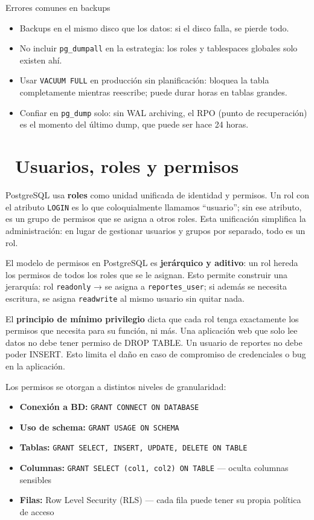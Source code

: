 \begin{warningbox}{Errores comunes en backups}
\begin{itemize}
  \item Backups en el mismo disco que los datos: si el disco falla, se pierde todo.
  \item No incluir \texttt{pg\_dumpall} en la estrategia: los roles y tablespaces globales solo existen ahí.
  \item Usar \texttt{VACUUM FULL} en producción sin planificación: bloquea la tabla completamente mientras reescribe; puede durar horas en tablas grandes.
  \item Confiar en \texttt{pg\_dump} solo: sin WAL archiving, el RPO (punto de recuperación) es el momento del último dump, que puede ser hace 24 horas.
\end{itemize}
\end{warningbox}

\section[Usuarios, roles y permisos]{~Usuarios, roles y permisos}

PostgreSQL usa \textbf{roles} como unidad unificada de identidad y permisos.
Un rol con el atributo \texttt{LOGIN} es lo que coloquialmente llamamos ``usuario''; sin ese atributo, es un grupo de permisos que se asigna a otros roles.
Esta unificación simplifica la administración: en lugar de gestionar usuarios y grupos por separado, todo es un rol.

El modelo de permisos en PostgreSQL es \textbf{jerárquico y aditivo}:
un rol hereda los permisos de todos los roles que se le asignan.
Esto permite construir una jerarquía: rol \texttt{readonly} → se asigna a \texttt{reportes\_user}; si además se necesita escritura, se asigna \texttt{readwrite} al mismo usuario sin quitar nada.

El \textbf{principio de mínimo privilegio} dicta que cada rol tenga exactamente los permisos que necesita para su función, ni más.
Una aplicación web que solo lee datos no debe tener permiso de DROP TABLE.
Un usuario de reportes no debe poder INSERT.
Esto limita el daño en caso de compromiso de credenciales o bug en la aplicación.

Los permisos se otorgan a distintos niveles de granularidad:
\begin{itemize}
  \item \textbf{Conexión a BD:} \texttt{GRANT CONNECT ON DATABASE}
  \item \textbf{Uso de schema:} \texttt{GRANT USAGE ON SCHEMA}
  \item \textbf{Tablas:} \texttt{GRANT SELECT, INSERT, UPDATE, DELETE ON TABLE}
  \item \textbf{Columnas:} \texttt{GRANT SELECT (col1, col2) ON TABLE} — oculta columnas sensibles
  \item \textbf{Filas:} Row Level Security (RLS) — cada fila puede tener su propia política de acceso
\end{itemize}

